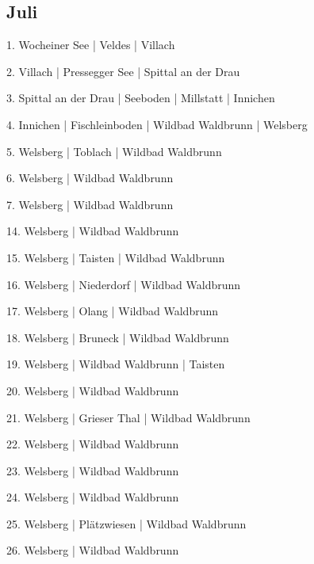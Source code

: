 \documentclass[twoside=false,titlepage=false,open=any, parskip=never, fontsize=10pt, headings=small, chapterprefix=false, appendixprefix=false, DIV=15]{scrbook}
\begin{document}
\begin{multicols}{3}
            \section*{Juli}
            1. Wocheiner See | Veldes | Villach\par
            2. Villach | Pressegger See | Spittal an der Drau\par
            3. Spittal an der Drau | Seeboden | Millstatt | Innichen\par
            4. Innichen | Fischleinboden | Wildbad Waldbrunn | Welsberg\par
            5. Welsberg | Toblach | Wildbad Waldbrunn\par
            6. Welsberg | Wildbad Waldbrunn\par
            7. Welsberg | Wildbad Waldbrunn\par
            14. Welsberg | Wildbad Waldbrunn\par
            15. Welsberg | Taisten | Wildbad Waldbrunn\par
            16. Welsberg | Niederdorf | Wildbad Waldbrunn\par
            17. Welsberg | Olang | Wildbad Waldbrunn\par
            18. Welsberg | Bruneck | Wildbad Waldbrunn\par
            19. Welsberg | Wildbad Waldbrunn | Taisten\par
            20. Welsberg | Wildbad Waldbrunn\par
            21. Welsberg | Grieser Thal | Wildbad Waldbrunn\par
            22. Welsberg | Wildbad Waldbrunn\par
            23. Welsberg | Wildbad Waldbrunn\par
            24. Welsberg | Wildbad Waldbrunn\par
            25. Welsberg | Plätzwiesen | Wildbad Waldbrunn\par
            26. Welsberg | Wildbad Waldbrunn\par

\end{multicols}
\end{document}
